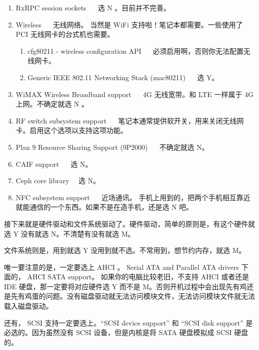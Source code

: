 \begin{enumerate}
\item RxRPC session sockets ~~ 选 N 。目前并不完善。

\item Wireless ~~ 无线网络。 当然是 WiFi 支持啦！笔记本都需要。一些使用了 PCI 无线网卡的台式机也需要。

\begin{enumerate}

\item cfg80211 - wireless configuration API ~~  必须启用啊，否则你无法配置无线网卡。

\item Generic IEEE 802.11 Networking Stack (mac80211) ~~ 选 Y。

\end{enumerate}

\item WiMAX Wireless Broadband support ~~ 4G 无线宽带。和 LTE 一样属于 4G 上网。不确定就选 N 。

\item RF switch subsystem support ~~ 笔记本通常提供软开关，用来关闭无线网卡。启用这个选项以支持这项功能。

\item Plan 9 Resource Sharing Support (9P2000) ~~ 不确定就选 N。

\item CAIF support ~~ 选 N。

\item Ceph core library~~ 选 N。
\item NFC subsystem support ~~ 近场通讯。 手机上用到的，把两个手机相互靠近就能通信的一个东西。如果不是在造手机，还是选 N 吧。 

\end{enumerate}

接下来就是硬件驱动和文件系统驱动了。硬件驱动，简单的原则是，有这个硬件就选 Y 没有就选 N。不清楚有没有就选 M。

文件系统则是，用到就选 Y 没用到就不选。不常用到，想节约内存，就选 M。

唯一要注意的是，一定要选上 AHCI 。 Serial ATA and Parallel ATA drivers 下面的，  AHCI SATA support。
如果你的电脑比较老旧，不支持 AHCI 或者还是 IDE 硬盘，那一定要将对应硬件选 Y 而不是 M。否则开机过程中会出现先有鸡还是先有鸡蛋的问题。没有磁盘驱动就无法访问模块文件，无法访问模块文件就无法载入磁盘驱动。

还有， SCSI 支持一定要选上。“SCSI device support” 和 “SCSI disk support” 是必选的。因为虽然没有 SCSI 设备，但是内核是将 SATA 硬盘模拟成 SCSI 硬盘的。

